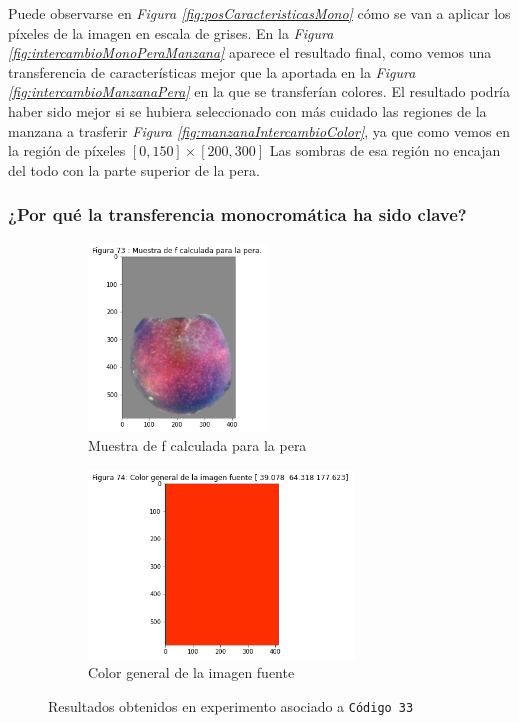 \documentclass[11pt,twoside,titlepage,a4paper]{article}
\numberwithin{equation}{section} %
\theoremstyle{usual}
\begin{document}
Puede observarse en \textit{Figura \ref{fig:posCaracteristicasMono}} cómo se van a aplicar los píxeles de la imagen en escala de grises.  En la \textit{Figura \ref{fig:intercambioMonoPeraManzana}} aparece el resultado final, como vemos una transferencia de características mejor que la aportada en la \textit{Figura \ref{fig:intercambioManzanaPera}} en la que se transferían colores. El resultado podría haber sido mejor si se hubiera seleccionado con más cuidado las regiones de la manzana a trasferir \textit{Figura \ref{fig:manzanaIntercambioColor}}, ya que como vemos en la región de píxeles $[0,150] \times [200, 300]$ Las sombras de esa región no encajan del todo con la parte superior de la pera. 

\subsubsection{¿Por qué la transferencia monocromática ha sido clave?}

\begin{figure}[h]
    \centering
    \begin{subfigure}[t]{.45\textwidth}
        \centering
        \includegraphics[height=5cm]{imagenes/PoissonImageEditing_cell_82_output_1.png}
        \caption{Muestra de f calculada para la pera}
        \label{fig:muestraFExperimento}
    \end{subfigure}
    \centering
    \begin{subfigure}[t]{.45\textwidth}
        \centering
        \includegraphics[height=5cm]{imagenes/PoissonImageEditing_cell_82_output_3.png}
        \caption{Color general de la imagen fuente}
        \label{fig:colorGeneralExperimento}
    \end{subfigure}%
    \caption{Resultados obtenidos en experimento asociado a \texttt{Código 33}}
    \label{fig:manzanaPeraIntercambioMono}
\end{figure}
\end{document}

